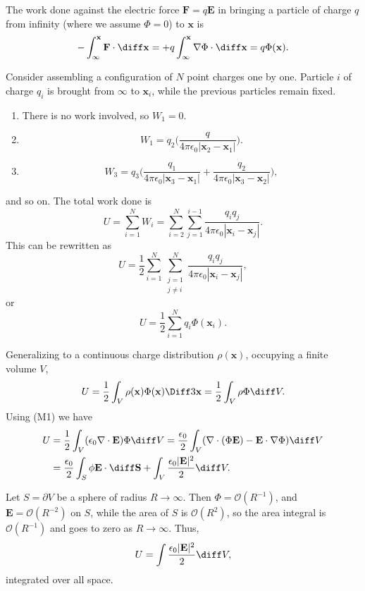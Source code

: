 \documentclass[12pt]{article}
\begin{document}
The work done against the electric force $\mathbf{F} = q \mathbf{E}$ in bringing a particle of charge $q$ from infinity (where we assume $\Phi = 0$) to $\mathbf{x}$ is
\[
- \int_{\infty}^{\mathbf{x}} \mathbf{F} \cdot \diff \mathbf{x} = +q \int_{\infty}^{\mathbf{x}} \nabla \Phi \cdot \diff \mathbf{x} = q \Phi (\mathbf{x})
.\]

Consider assembling a configuration of $N$ point charges one by one. Particle $i$ of charge $q_i$ is brought from $\infty$ to $\mathbf{x}_i$, while the previous particles remain fixed.
\begin{enumerate}[label = Particle \arabic*.]
	\item There is no work involved, so $W_1 = 0$.
	\item
		\[
		W_1 = q_2 \biggl( \frac{q}{4 \pi \epsilon_0 |\mathbf{x}_2 - \mathbf{x}_1|} \biggr)
		.\]
	\item
		\[
		W_3 = q_3 \biggl( \frac{q_1}{4 \pi \epsilon_0 |\mathbf{x}_3 - \mathbf{x}_1|} + \frac{q_2}{4 \pi \epsilon_0|\mathbf{x}_3 - \mathbf{x}_2|} \biggr)
		,\]
\end{enumerate}
and so on. The total work done is
\[
U = \sum_{i = 1}^{N} W_i = \sum_{i = 2}^{N} \sum_{j = 1}^{i-1} \frac{q_i q_j}{4 \pi \epsilon_0 |\mathbf{x}_i - \mathbf{x}_j|}
.\] 
This can be rewritten as
\[
	U = \frac{1}{2} \sum_{i = 1}^{N}\sum_{\substack{j=1\\j\neq i}}^{N} \frac{q_i q_j}{4 \pi \epsilon_0|\mathbf{x}_i - \mathbf{x}_j|}
,\]
or
\[
U = \frac{1}{2} \sum_{i = 1}^{N} q_i \Phi(\mathbf{x}_i)
.\]

Generalizing to a continuous charge distribution $\rho(\mathbf{x})$, occupying a finite volume $V$,
\[
U = \frac{1}{2} \int_{V} \rho(\mathbf{x}) \Phi(\mathbf{x}) \Diff3 \mathbf{x} = \frac{1}{2} \int_{V} \rho \Phi \diff V
.\]
Using (M1) we have
\begin{align*}
	U &= \frac{1}{2} \int_{V} (\epsilon_0 \nabla \cdot \mathbf{E}) \Phi \diff V = \frac{\epsilon_0}{2} \int_{V} (\nabla \cdot (\Phi \mathbf{E}) - \mathbf{E} \cdot \nabla \Phi) \diff V \\
	  &= \frac{\epsilon_0}{2} \int_{S} \phi \mathbf{E} \cdot \diff \mathbf{S} + \int_{V} \frac{\epsilon_0|\mathbf{E}|^2}{2} \diff V
.\end{align*}

Let $S = \partial V$ be a sphere of radius $R \to \infty$. Then $\Phi = \mathcal{O}(R^{-1})$, and $\mathbf{E} = \mathcal{O}(R^{-2})$ on $S$, while the area of $S$ is $\mathcal{O}(R^2)$, so the area integral is $\mathcal{O}(R^{-1})$ and goes to zero as $R \to \infty$. Thus,
\[
U = \int \frac{\epsilon_0 |\mathbf{E}|^2}{2} \diff V
,\]
integrated over all space.
\end{document}

